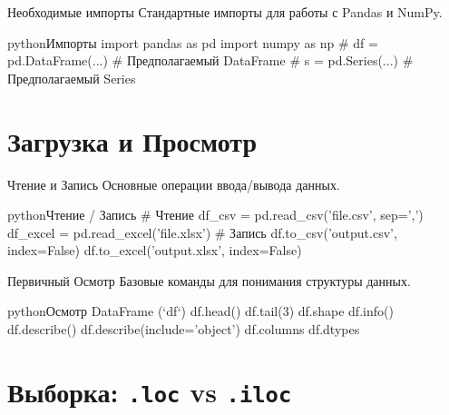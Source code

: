 
\begin{myblock}{Необходимые импорты}
    Стандартные импорты для работы с Pandas и NumPy.
    \begin{codebox}{python}{Импорты}
    import pandas as pd
    import numpy as np
    # df = pd.DataFrame(...) # Предполагаемый DataFrame
    # s = pd.Series(...) # Предполагаемый Series
    \end{codebox}
    \end{myblock}
    
    \section{Загрузка и Просмотр}
    
    \begin{myblock}{Чтение и Запись}
    Основные операции ввода/вывода данных.
    \begin{codebox}{python}{Чтение / Запись}
    # Чтение
    df_csv = pd.read_csv('file.csv', sep=',')
    df_excel = pd.read_excel('file.xlsx')
    # Запись
    df.to_csv('output.csv', index=False)
    df.to_excel('output.xlsx', index=False)
    \end{codebox}
    \end{myblock}
    
    \begin{myblock}{Первичный Осмотр}
    Базовые команды для понимания структуры данных.
    \begin{codebox}{python}{Осмотр DataFrame (`df`)}
    df.head()
    df.tail(3)
    df.shape
    df.info()
    df.describe()
    df.describe(include='object')
    df.columns
    df.dtypes
    \end{codebox}
    \end{myblock}
    
    \section{Выборка: \texttt{.loc} vs \texttt{.iloc}}
    
